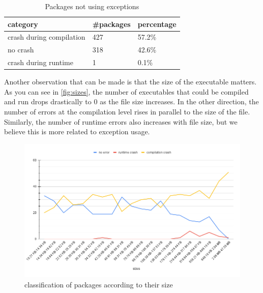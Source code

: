 \documentclass[a4paper,11pt,oneside]{report}
\begin{document}
\begin{table}[H]
    \centering
    \begin{tabular}{lll} 
        \hline
        category                & \#packages & percentage \\ 
        \hline
        crash during compilation & 427  & 57.2\%      \\
        no crash                 & 318  & 42.6\%      \\
        crash during runtime     & 1    & 0.1\%      \\
        \hline
    \end{tabular}
    \caption{Packages not using exceptions}
\end{table}

Another observation that can be made is that the size of the executable
matters. As you can see in \autoref{fig:sizes}, the number of executables that
could be compiled and run drops drastically to 0 as the file size increases. In
the other direction, the number of errors at the compilation level rises in
parallel to the size of the file. Similarly, the number of runtime errors also
increases with file size, but we believe this is more related to exception
usage.

\begin{figure}[H]
    \includegraphics[width=\linewidth]{chart.png} 
    \caption{classification of packages according to their size}
    \label{fig:sizes}
\end{figure}
\end{document}

